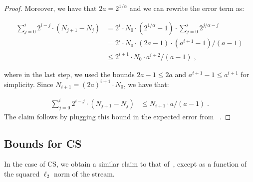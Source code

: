 \documentclass[sigconf]{acmart}
\begin{document}
\begin{proof}
\noindent
Moreover, we have that $2a = 2^{1/\alpha}$ and we can rewrite the error term as:

\begin{align*}
\sum_{j=0}^i  2^{i-j} \cdot  (N_{j+1} - N_j) & = 2^i \cdot N_0 \cdot (2^{1/\alpha} -1) \cdot   \sum_{j=0}^i   2^{j/\alpha- j}  \\
&= 2^i \cdot N_0 \cdot (2a -1) \cdot (a^{i+1}-1)/(a-1)  \\
&\leq  2^{i+1} \cdot N_0 \cdot  a^{i+2}/(a-1) \;,
\end{align*}	

where in the last step, we used the bounds $2a-1 \leq 2a$ and $a^{i+1}-1\leq a^{i+1}$ for simplicity. Since $N_{i+1} = (2a)^{i+1} \cdot N_0$, we have that:



\begin{align*}
\sum_{j=0}^i  2^{i-j} \cdot  (N_{j+1} - N_j) &\leq  N_{i+1} \cdot a/(a-1)  \;.
\end{align*}
The claim follows by plugging this bound in the expected error from ~.


\end{proof}

\subsection{Bounds for CS}

In the case of CS,  we obtain a similar claim to that of~, except as a function of the squared $\ell_2$ norm of the stream.
\end{document}
